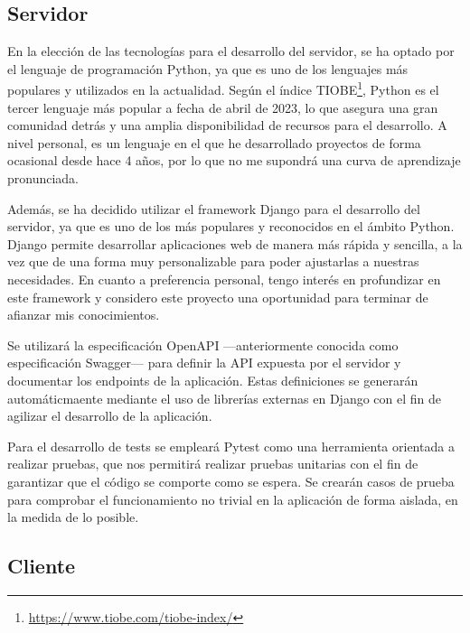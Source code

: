 
\subsection{Servidor}

En la elección de las tecnologías para el desarrollo del servidor, se ha optado por el lenguaje de programación Python, ya que es uno de los lenguajes más populares y utilizados en la actualidad. Según el índice TIOBE\footnote{\url{https://www.tiobe.com/tiobe-index/}}, Python es el tercer lenguaje más popular a fecha de abril de 2023, lo que asegura una gran comunidad detrás y una amplia disponibilidad de recursos para el desarrollo. A nivel personal, es un lenguaje en el que he desarrollado proyectos de forma ocasional desde hace 4 años, por lo que no me supondrá una curva de aprendizaje pronunciada.

Además, se ha decidido utilizar el framework Django para el desarrollo del servidor, ya que es uno de los más populares y reconocidos en el ámbito Python. Django permite desarrollar aplicaciones web de manera más rápida y sencilla, a la vez que de una forma muy personalizable para poder ajustarlas a nuestras necesidades. En cuanto a preferencia personal, tengo interés en profundizar en este framework y considero este proyecto una oportunidad para terminar de afianzar mis conocimientos.

Se utilizará la especificación OpenAPI —anteriormente conocida como especificación Swagger— para definir la API expuesta por el servidor y documentar los endpoints de la aplicación. Estas definiciones se generarán automáticmaente mediante el uso de librerías externas en Django con el fin de agilizar el desarrollo de la aplicación.

Para el desarrollo de tests se empleará Pytest como una herramienta orientada a realizar pruebas, que nos permitirá realizar pruebas unitarias con el fin de garantizar que el código se comporte como se espera. Se crearán casos de prueba para comprobar el funcionamiento no trivial en la aplicación de forma aislada, en la medida de lo posible.


\subsection{Cliente}

